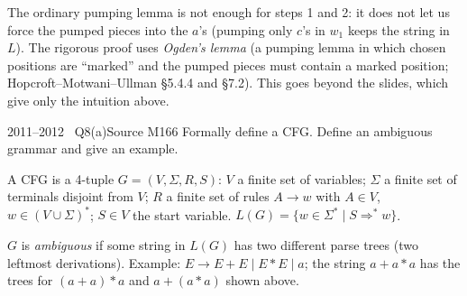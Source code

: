 \documentclass[11pt,a4paper]{article}
\begin{document}
\begin{solution}
\begin{note}The ordinary pumping lemma is not enough for steps 1 and 2: it does not let us force the pumped pieces into the $a$'s (pumping only $c$'s in $w_1$ keeps the string in $L$). The rigorous proof uses \emph{Ogden's lemma} (a pumping lemma in which chosen positions are ``marked'' and the pumped pieces must contain a marked position; Hopcroft--Motwani--Ullman \S5.4.4 and \S7.2). This goes beyond the slides, which give only the intuition above.\end{note}
\end{solution}

\begin{question}{2011--2012 \textbullet\ Q8(a)}{Source M16}{6}
Formally define a CFG. Define an ambiguous grammar and give an example.
\end{question}
\begin{solution}
A CFG is a 4-tuple $G=(V,\Sigma,R,S)$: $V$ a finite set of variables; $\Sigma$ a finite set of terminals disjoint from $V$; $R$ a finite set of rules $A\to w$ with $A\in V$, $w\in(V\cup\Sigma)^*$; $S\in V$ the start variable. $L(G)=\{w\in\Sigma^*\mid S\Rightarrow^*w\}$.

$G$ is \emph{ambiguous} if some string in $L(G)$ has two different parse trees (two leftmost derivations). Example: $E\to E+E\mid E*E\mid a$; the string $a+a*a$ has the trees for $(a+a)*a$ and $a+(a*a)$ shown above.
\end{solution}
\end{document}
